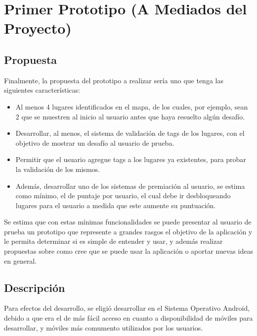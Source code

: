 \documentclass[10pt,letterpaper]{article}
\begin{document}
\newpage
\section{Primer Prototipo (A Mediados del Proyecto)}

\subsection{Propuesta}

Finalmente, la propuesta del prototipo a realizar sería uno que tenga las siguientes características:

\begin{itemize}
\item Al menos 4 lugares identificados en el mapa, de los cuales, por ejemplo, sean 2 que se muestren al inicio al usuario antes que haya resuelto algún desafío.

\item Desarrollar, al menos, el sistema de validación de tags de los lugares, con el objetivo de mostrar un desafío al usuario de prueba.

\item Permitir que el usuario agregue tags a los lugares ya existentes, para probar la validación de los mismos.

\item Además, desarrollar uno de los sistemas de premiación al usuario, se estima como mínimo, el de puntaje por usuario, el cual debe ir desbloqueando lugares para el usuario a medida que este aumente su puntuación.
\end{itemize}

Se estima que con estas mínimas funcionalidades se puede presentar al usuario de prueba un prototipo que represente a grandes rasgos el objetivo de la aplicación y le permita determinar si es simple de entender y usar, y además realizar propuestas sobre como cree que se puede usar la aplicación o aportar nuevas ideas en general.


\subsection{Descripción}

Para efectos del desarrollo, se eligió desarrollar en el Sistema Operativo Android, debido a que era el de más fácil acceso en cuanto a disponibilidad de móviles para desarrollar, y móviles más comumento utilizados por los usuarios.\\
\end{document}
